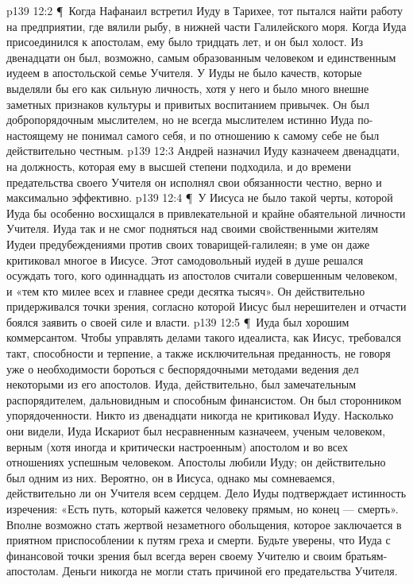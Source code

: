 \vs p139 12:2 \P\ Когда Нафанаил встретил Иуду в Тарихее, тот пытался найти работу на предприятии, где вялили рыбу, в нижней части Галилейского моря. Когда Иуда присоединился к апостолам, ему было тридцать лет, и он был холост. Из двенадцати он был, возможно, самым образованным человеком и единственным иудеем в апостольской семье Учителя. У Иуды не было качеств, которые выделяли бы его как сильную личность, хотя у него и было много внешне заметных признаков культуры и привитых воспитанием привычек. Он был добропорядочным мыслителем, но не всегда мыслителем истинно  Иуда по\hyp{}настоящему не понимал самого себя, и по отношению к самому себе не был действительно честным.
\vs p139 12:3 Андрей назначил Иуду казначеем двенадцати, на должность, которая ему в высшей степени подходила, и до времени предательства своего Учителя он исполнял свои обязанности честно, верно и максимально эффективно.
\vs p139 12:4 \P\ У Иисуса не было такой черты, которой Иуда бы особенно восхищался в привлекательной и крайне обаятельной личности Учителя. Иуда так и не смог подняться над своими свойственными жителям Иудеи предубеждениями против своих товарищей\hyp{}галилеян; в уме он даже критиковал многое в Иисусе. Этот самодовольный иудей в душе решался осуждать того, кого одиннадцать из апостолов считали совершенным человеком, и «тем кто милее всех и главнее среди десятка тысяч». Он действительно придерживался точки зрения, согласно которой Иисус был нерешителен и отчасти боялся заявить о своей силе и власти.
\vs p139 12:5 \P\ Иуда был хорошим коммерсантом. Чтобы управлять делами такого идеалиста, как Иисус, требовался такт, способности и терпение, а также исключительная преданность, не говоря уже о необходимости бороться с беспорядочными методами ведения дел некоторыми из его апостолов. Иуда, действительно, был замечательным распорядителем, дальновидным и способным финансистом. Он был сторонником упорядоченности. Никто из двенадцати никогда не критиковал Иуду. Насколько они видели, Иуда Искариот был несравненным казначеем, ученым человеком, верным (хотя иногда и критически настроенным) апостолом и во всех отношениях успешным человеком. Апостолы любили Иуду; он действительно был одним из них. Вероятно, он  в Иисуса, однако мы сомневаемся, действительно ли он  Учителя всем сердцем. Дело Иуды подтверждает истинность изречения: «Есть путь, который кажется человеку прямым, но конец --- смерть». Вполне возможно стать жертвой незаметного обольщения, которое заключается в приятном приспособлении к путям греха и смерти. Будьте уверены, что Иуда с финансовой точки зрения был всегда верен своему Учителю и своим братьям\hyp{}апостолам. Деньги никогда не могли стать причиной его предательства Учителя.
